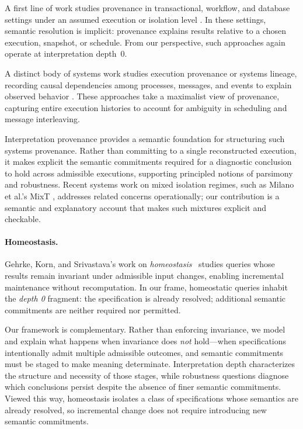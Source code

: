 \documentclass[acmsmall,nonacm]{acmart}
\theoremstyle{remark}
\numberwithin{definition}{section}
\numberwithin{theorem}{section}
\numberwithin{lemma}{section}
\numberwithin{corollary}{section}
\numberwithin{remark}{section}
\numberwithin{example}{section}
\numberwithin{observation}{section}
\numberwithin{assumption}{section}
\begin{document}
A first line of work studies provenance in transactional, workflow, and database
settings under an assumed execution or isolation level
\cite{bernstein1987concurrency,adya1999weak,cerone2015consistency,cheney2009provenance,freire2008provenance}.
In these settings, semantic resolution is implicit: provenance explains results
relative to a chosen execution, snapshot, or schedule.
From our perspective, such approaches again operate at interpretation depth~0.

A distinct body of systems work studies execution provenance or systems lineage,
recording causal dependencies among processes, messages, and events to explain
observed behavior
\cite{seltzer2005provenance,bates2015trustworthy,sigelman2010dapper}.
These approaches take a maximalist view of provenance, capturing entire execution
histories to account for ambiguity in scheduling and message interleaving.

Interpretation provenance provides a semantic foundation for structuring such
systems provenance.
Rather than committing to a single reconstructed execution, it makes explicit
the semantic commitments required for a diagnostic conclusion to hold across
admissible executions, supporting principled notions of parsimony and robustness.
Recent systems work on mixed isolation regimes, such as Milano et al.’s MixT
\cite{milano2020mixt}, addresses related concerns operationally; our contribution
is a semantic and explanatory account that makes such mixtures explicit and
checkable.

\paragraph{Homeostasis.}
Gehrke, Korn, and Srivastava’s work on \emph{homeostasis}~\cite{gehrke2002homeostasis}
studies queries whose results remain invariant under admissible input changes,
enabling incremental maintenance without recomputation.
In our frame, homeostatic queries inhabit the \emph{depth 0} fragment:
the specification is already resolved; additional semantic commitments are
neither required nor permitted.

Our framework is complementary.
Rather than enforcing invariance, we model and explain what happens when
invariance does \emph{not} hold—when specifications intentionally admit multiple
admissible outcomes, and semantic commitments must be staged to make meaning
determinate.
Interpretation depth characterizes the structure and necessity of those stages,
while robustness questions diagnose which conclusions persist despite the
absence of finer semantic commitments.
Viewed this way, homeostasis isolates a class of specifications whose semantics
are already resolved, so incremental change does not require introducing new
semantic commitments.
\end{document}
